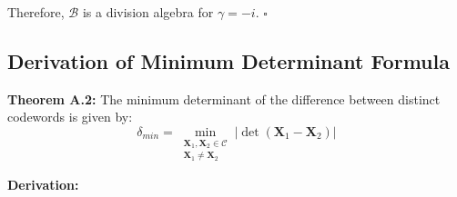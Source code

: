 Therefore, $\mathcal{B}$ is a division algebra for $\gamma = -i$. $\square$

\subsection{Derivation of Minimum Determinant Formula}

\textbf{Theorem A.2:} The minimum determinant of the difference between distinct codewords is given by:
\begin{equation}
\delta_{min} = \min_{\substack{\mathbf{X}_1, \mathbf{X}_2 \in \mathcal{C} \\ \mathbf{X}_1 \neq \mathbf{X}_2}} |\det(\mathbf{X}_1 - \mathbf{X}_2)|
\end{equation}

\textbf{Derivation:}

